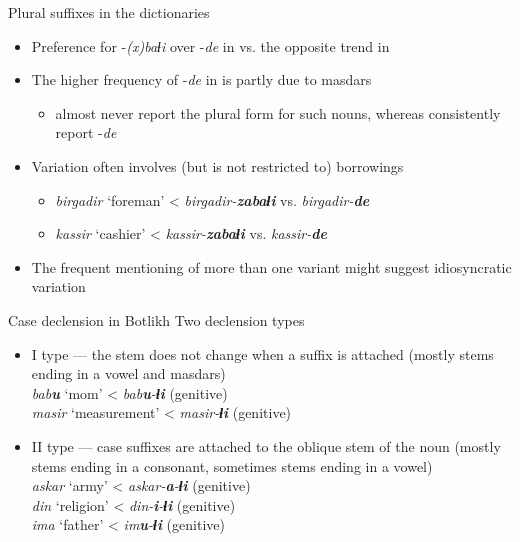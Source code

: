 \begin{frame}{Plural suffixes in the dictionaries}
\begin{itemize}
    \item Preference for -\textit{(x)baɬi} over -\textit{de} in \citet{saidovaabusov2012} vs. the opposite trend in \citet{alekseev2019}
    \item The higher frequency of -\textit{de} in \citet{alekseev2019} is partly due to masdars
    \begin{itemize}
        \item \citet{saidovaabusov2012} almost never report the plural form for such nouns, whereas \citet{alekseev2019} consistently report -\textit{de}
    \end{itemize}
    \item Variation often involves (but is not restricted to) borrowings
    \begin{itemize}
        \item \textit{birgadir} `foreman' < \textit{birgadir-\textbf{zabaɬi}} vs. \textit{birgadir-\textbf{de}}
        \item \textit{kassir} `cashier' < \textit{kassir-\textbf{zabaɬi}} vs. \textit{kassir-\textbf{de}}
    \end{itemize}
    \item The frequent mentioning of more than one variant might suggest idiosyncratic variation
\end{itemize}
\end{frame}

\begin{frame}{Case declension in Botlikh}
Two declension types
\begin{itemize}
    \item I type --- the stem does not change when a suffix is attached (mostly stems ending in a vowel and masdars) \\ \textit{bab\textbf{u}} `mom' < \textit{bab\textbf{u}-\textbf{ɬi}} (genitive) \\ \textit{masir} `measurement' < \textit{masir-\textbf{ɬi}} (genitive)  
    \item II type --- case suffixes are attached to the oblique stem of the noun (mostly stems ending in a consonant, sometimes stems ending in a vowel) \\ \textit{askar} `army' < \textit{askar-\textbf{a}-\textbf{ɬi}} (genitive) \\ \textit{din} `religion' < \textit{din-\textbf{i}-\textbf{ɬi}} (genitive) \\ \textit{ima} `father' < \textit{im\textbf{u}-\textbf{ɬi}} (genitive) 
\end{itemize}
\end{frame}

